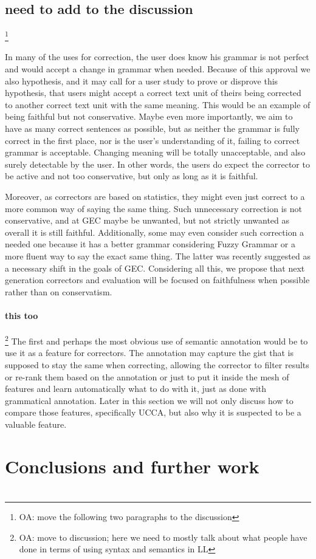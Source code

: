 \documentclass[english]{article}
\newcommand{\oa}[1]{\footnote{\color{red}OA: #1}}
\begin{document}
	\subsection{need to add to the discussion}
	\oa{move the following two paragraphs to the discussion}
	{\color{red} In many of the uses for correction,
		the user does know his grammar is not perfect and would accept
		a change in grammar when needed. Because of this approval we also
		hypothesis, and it may call for a user study to prove or disprove
		this hypothesis, that users might accept a correct text unit of theirs
		being corrected to another correct text unit with the same meaning.
		This would be an example of being faithful but not conservative.
		Maybe even more importantly, we aim to have as many correct sentences
		as possible, but as neither the grammar is fully correct in the first place,
		nor is the user's understanding of it, failing to correct grammar
		is acceptable. Changing meaning will be totally unacceptable, and
		also surely detectable by the user. In other words, the users do expect
		the corrector to be active and not too conservative, but
		only as long as it is faithful. 
		
		Moreover, as correctors are based on statistics, they might even
		just correct to a more common way of saying the same thing. Such unnecessary
		correction is not conservative, and at GEC maybe be unwanted, but not strictly unwanted as overall
		it is still faithful. Additionally, some may even
		consider such correction a needed one because it has a better grammar considering
		Fuzzy Grammar\cite{lakoff1973fuzzy,madnani2011they} or a more fluent
		way to say the exact same thing. The latter was recently suggested as a necessary
		shift in the goals of GEC\cite{sakaguchi2016reassessing}.
		Considering all this, we propose that next generation correctors and evaluation will be focused on faithfulness
		when possible rather than on conservatism.
		}
		
		\paragraph{this too}
		\oa{move to discussion; here we need to mostly talk about what people have done in terms
			of using syntax and semantics in LL}
			{\color{red}
				The first and perhaps the most obvious use of semantic annotation
				would be to use it as a feature for correctors. The annotation may
				capture the gist that is supposed to stay the same when correcting,
				allowing the corrector to filter results or re-rank them based on
				the annotation or just to put it inside the mesh of features and learn
				automatically what to do with it, just as done with grammatical annotation.
				Later in this section we will not only discuss how to compare those
				features, specifically UCCA, but also why it is suspected to be a
				valuable feature.}

\section{Conclusions and further work}



\appendix
\section{}
\end{document}
